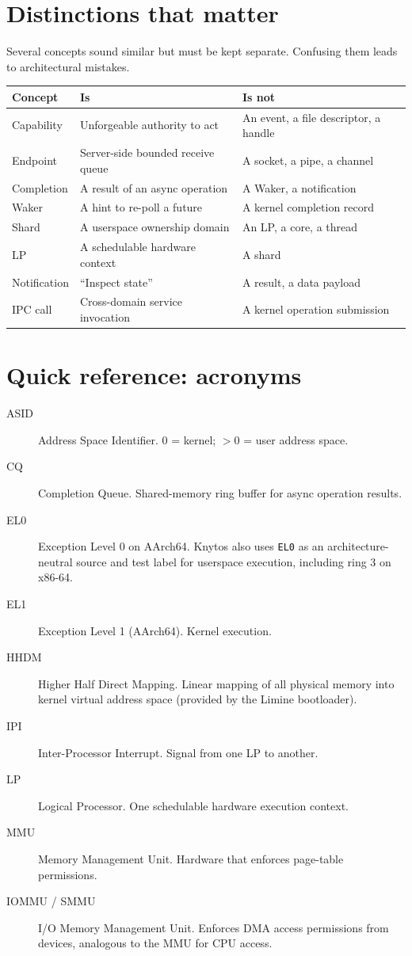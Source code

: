 \section{Distinctions that matter}

Several concepts sound similar but must be kept separate. Confusing them leads to
architectural mistakes.

\begin{center}
\begin{tabular}{|l|l|l|}
\hline
\textbf{Concept} & \textbf{Is} & \textbf{Is not} \\
\hline
Capability & Unforgeable authority to act & An event, a file descriptor, a handle \\
Endpoint & Server-side bounded receive queue & A socket, a pipe, a channel \\
Completion & A result of an async operation & A Waker, a notification \\
Waker & A hint to re-poll a future & A kernel completion record \\
Shard & A userspace ownership domain & An LP, a core, a thread \\
LP & A schedulable hardware context & A shard \\
Notification & ``Inspect state'' & A result, a data payload \\
IPC call & Cross-domain service invocation & A kernel operation submission \\
\hline
\end{tabular}
\end{center}

\section{Quick reference: acronyms}

\begin{description}
    \item[ASID] Address Space Identifier. 0 = kernel; $>$0 = user address space.
    \item[CQ] Completion Queue. Shared-memory ring buffer for async operation
        results.
    \item[EL0] Exception Level 0 on AArch64. Knytos also uses
        \texttt{EL0} as an architecture-neutral source and test label for
        userspace execution, including ring 3 on x86-64.
    \item[EL1] Exception Level 1 (AArch64). Kernel execution.
    \item[HHDM] Higher Half Direct Mapping. Linear mapping of all physical memory
        into kernel virtual address space (provided by the Limine bootloader).
    \item[IPI] Inter-Processor Interrupt. Signal from one LP to another.
    \item[LP] Logical Processor. One schedulable hardware execution context.
    \item[MMU] Memory Management Unit. Hardware that enforces page-table
        permissions.
    \item[IOMMU / SMMU] I/O Memory Management Unit. Enforces DMA access
        permissions from devices, analogous to the MMU for CPU access.
\end{description}

\endinput
